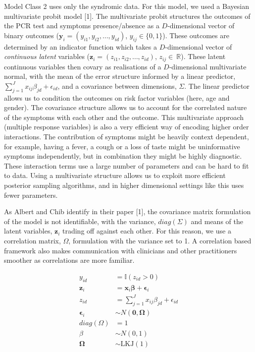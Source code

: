 \documentclass[]{elsarticle} %
\begin{document}
Model Class 2 uses only the syndromic data.
For this model, we used a Bayesian multivariate probit model {[}1{]}.
The multivariate probit structures the outcomes of the PCR test and symptoms presence/absence as a \(D\)-dimensional vector of binary outcomes (\(\boldsymbol{y}_i=(y_{i1},y_{i2},\dots,y_{id})\), \(y_{ij}\in\{0,1\}\)).
These outcomes are determined by an indicator function which takes a \(D\)-dimensional vector of \emph{continuous latent} variables (\(\boldsymbol{z}_i=(z_{i1},z_{i2},\dots,z_{id})\), \(z_{ij}\in\ \mathbb{R}\)).
These latent continuous variables then covary as realisations of a \(D\)-dimensional multivariate normal,
with the mean of the error structure informed by a linear predictor, \(\sum_{j=1}^J x_{ij}\beta_{jd} + \epsilon_{id}\), and a covariance between dimensions, \(\Sigma\).
The linear predictor allows us to condition the outcomes on risk factor variables (here, age and gender).
The covariance structure allows us to account for the correlated nature of the symptoms with each other and the outcome.
This multivariate approach (multiple response variables) is also a very efficient way of encoding higher order interactions.
The contribution of symptoms might be heavily context dependent, for example, having a fever, a cough or a loss of taste might be uninformative symptoms independently, but in combination they might be highly diagnostic.
These interaction terms use a large number of parameters and can be hard to fit to data.
Using a multivariate structure allows us to exploit more efficient posterior sampling algorithms, and in higher dimensional settings like this uses fewer parameters.

As Albert and Chib identify in their paper {[}1{]}, the covariance matrix formulation of the model is not identifiable, with the variance, \(diag (\Sigma)\) and means of the latent variables, \(\boldsymbol{z}_i\) trading off against each other.
For this reason, we use a correlation matrix, \(\Omega\), formulation with the variance set to 1.
A correlation based framework also makes communication with clinicians and other practitioners smoother as correlations are more familiar.

\begin{equation}\begin{aligned}
y_{id} &= \mathbb{I}(z_{id} > 0) \\
\boldsymbol{z}_{i} &= \boldsymbol{x}_i \boldsymbol{\beta} + \boldsymbol{\epsilon}_{i} \\
z_{id} &= \sum_{j=1}^J x_{ij}\beta_{jd} + \epsilon_{id} \\
\boldsymbol{\epsilon}_i &\sim N(\boldsymbol{0}, \boldsymbol{\Omega}) \\
diag(\Omega)&=1 \\
{\beta} &\sim N(0,1) \\
\boldsymbol{\Omega} &\sim \text{LKJ}(1)
\label{eq:ModelClass2}
\end{aligned}\end{equation}\ignorespacesafterend
\end{document}
